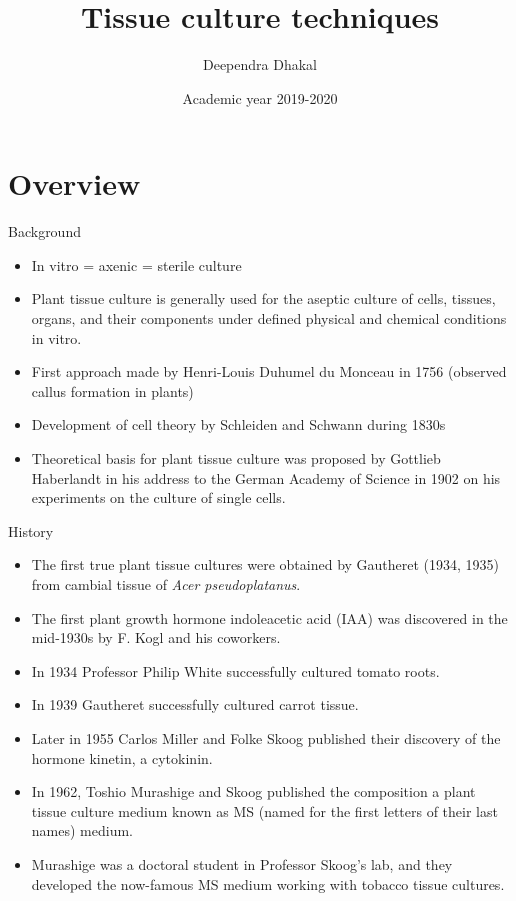 \documentclass[ignorenonframetext,aspectratio=169]{beamer}
\title{Tissue culture techniques}
\author{Deependra Dhakal}
\institute{GAASC, Baitadi \and Tribhuwan University}
\date{Academic year 2019-2020}
\providecommand{\tightlist}{%
  \setlength{\itemsep}{0pt}\setlength{\parskip}{0pt}}
\begin{document}
\frame{\titlepage}

\begin{frame}
\tableofcontents[hideallsubsections]
\end{frame}
\hypertarget{overview}{%
\section{Overview}\label{overview}}

\begin{frame}{Background}
\protect\hypertarget{background}{}

\begin{itemize}
\tightlist
\item
  In vitro = axenic = sterile culture
\item
  Plant tissue culture is generally used for the aseptic culture of
  cells, tissues, organs, and their components under defined physical
  and chemical conditions in vitro.
\item
  First approach made by Henri-Louis Duhumel du Monceau in 1756
  (observed callus formation in plants)
\item
  Development of cell theory by Schleiden and Schwann during 1830s
\item
  Theoretical basis for plant tissue culture was proposed by Gottlieb
  Haberlandt in his address to the German Academy of Science in 1902 on
  his experiments on the culture of single cells.
\end{itemize}

\end{frame}

\begin{frame}{History}
\protect\hypertarget{history}{}

\begin{itemize}
\tightlist
\item
  The first true plant tissue cultures were obtained by Gautheret (1934,
  1935) from cambial tissue of \emph{Acer pseudoplatanus}.
\item
  The first plant growth hormone indoleacetic acid (IAA) was discovered
  in the mid-1930s by F. Kogl and his coworkers.
\item
  In 1934 Professor Philip White successfully cultured tomato roots.
\item
  In 1939 Gautheret successfully cultured carrot tissue.
\item
  Later in 1955 Carlos Miller and Folke Skoog published their discovery
  of the hormone kinetin, a cytokinin.
\item
  In 1962, Toshio Murashige and Skoog published the composition a plant
  tissue culture medium known as MS (named for the first letters of
  their last names) medium.
\item
  Murashige was a doctoral student in Professor Skoog's lab, and they
  developed the now-famous MS medium working with tobacco tissue
  cultures.
\end{itemize}

\end{frame}
\end{document}
